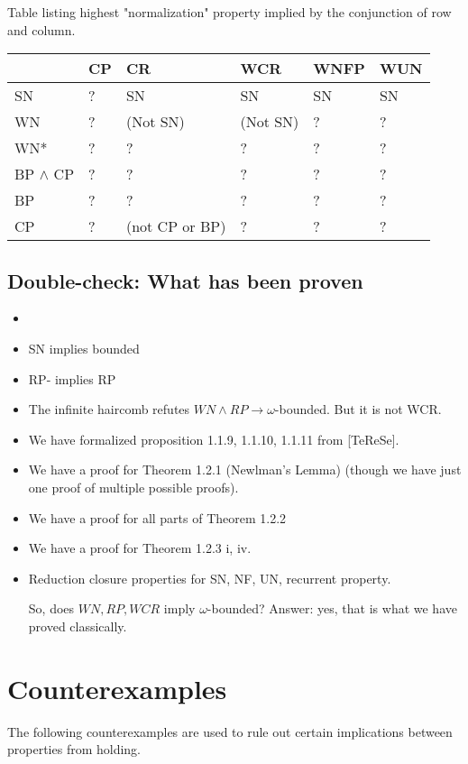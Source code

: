 \documentclass{scrartcl}
\begin{document}
Table listing highest "normalization" property implied
by the conjunction of row and column.


\begin{tabular}{@{}l@{\quad}l@{\quad}l@{\quad}l@{\quad}l@{\quad}l@{}}
  \toprule
  & CP & CR & WCR & WNFP & WUN \\
  \midrule
  SN  &?& SN & SN & SN & SN \\
  WN  &?& (Not SN) & (Not SN) & ? & ? \\
  WN*  &?& ? & ? & ? & ? \\
  BP $\land$ CP   &?& ? & ? & ? & ? \\
  BP  &?& ? & ? & ? & ? \\
  CP  &?& (not CP or BP) & ? & ? & ? \\
  \bottomrule
\end{tabular}

\subsection{Double-check: What has been proven}
\begin{itemize}
  \item {}
  \item SN implies bounded
  \item RP- implies RP
  \item The infinite haircomb refutes $WN \land RP \to \omega$-bounded.  But it is not WCR.
  \item We have formalized proposition 1.1.9, 1.1.10, 1.1.11 from [TeReSe].
  \item We have a proof for Theorem 1.2.1 (Newlman's Lemma) (though we have just one proof of multiple possible proofs).
  \item We have a proof for all parts of Theorem 1.2.2
  \item We have a proof for Theorem 1.2.3 i, iv.
  \item Reduction closure properties for SN, NF, UN, recurrent property.

  So, does $WN, RP, WCR$ imply $\omega$-bounded?
  Answer: yes, that is what we have proved classically.
\end{itemize}




\newpage
\section{Counterexamples}
The following counterexamples are used to rule out certain implications between properties from holding.
\end{document}
